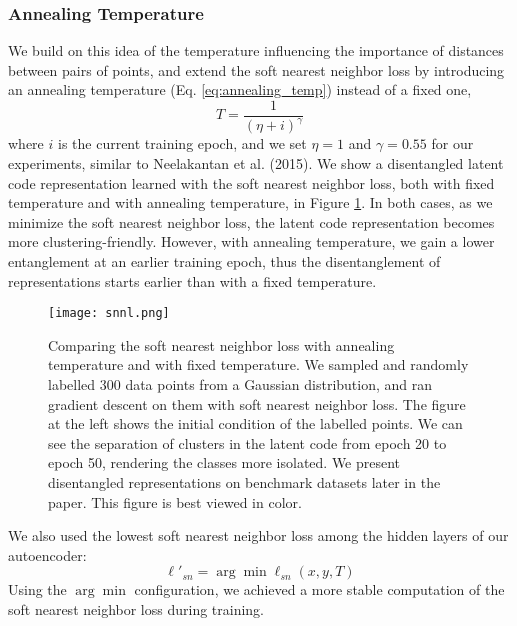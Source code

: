 \documentclass[conference]{IEEEtran}
\begin{document}
\subsubsection{Annealing Temperature} We build on this idea of the temperature influencing the importance of distances between pairs of points, and extend the soft nearest neighbor loss by introducing an annealing temperature (Eq. \ref{eq:annealing_temp}) instead of a fixed one,
\begin{equation}\label{eq:annealing_temp}
    T = \dfrac{1}{(\eta + i)^{\gamma}}
\end{equation}
where $i$ is the current training epoch, and we set $\eta=1$ and $\gamma=0.55$ for our experiments, similar to Neelakantan et al. (2015)\cite{neelakantan2015adding}. We show a disentangled latent code representation learned with the soft nearest neighbor loss, both with fixed temperature and with annealing temperature, in Figure \ref{fig:synthetic_snnl}. In both cases, as we minimize the soft nearest neighbor loss, the latent code representation becomes more clustering-friendly. However, with annealing temperature, we gain a lower entanglement at an earlier training epoch, thus the disentanglement of representations starts earlier than with a fixed temperature.

\begin{figure}[htb!]
    \centering
    \texttt{[image: snnl.png]}
    \caption{Comparing the soft nearest neighbor loss with annealing temperature and with fixed temperature. We sampled and randomly labelled 300 data points from a Gaussian distribution, and ran gradient descent on them with soft nearest neighbor loss. The figure at the left shows the initial condition of the labelled points. We can see the separation of clusters in the latent code from epoch 20 to epoch 50, rendering the classes more isolated. We present disentangled representations on benchmark datasets later in the paper. This figure is best viewed in color.}
    \label{fig:synthetic_snnl}
\end{figure}

We also used the lowest soft nearest neighbor loss among the hidden layers of our autoencoder:
\begin{equation}
    \ell'_{sn} = \arg\min \ell_{sn}(x, y, T)
\end{equation}
Using the $\arg\min$ configuration, we achieved a more stable computation of the soft nearest neighbor loss during training.
\end{document}
